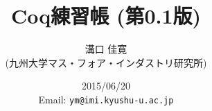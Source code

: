 \documentclass{jreport}
\begin{document}
\title{Coq練習帳 (第0.1版)}
\author{溝口 佳寛 \\ (九州大学マス・フォア・インダストリ研究所)}
\date{2015/06/20 \\ Email: {\tt ym@imi.kyushu-u.ac.jp}}

\maketitle

\tableofcontents

  
  
  
  
\end{document}
